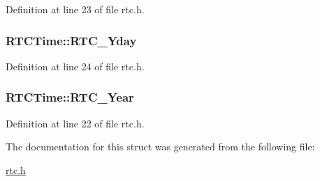 Definition at line 23 of file rtc.h.

\hypertarget{struct_r_t_c_time_aad91737813b216f18c7268b74b33d91a}{
\subsubsection[{RTC\_\-Yday}]{ {\bf RTCTime::RTC\_\-Yday}}}
\label{struct_r_t_c_time_aad91737813b216f18c7268b74b33d91a}


Definition at line 24 of file rtc.h.

\hypertarget{struct_r_t_c_time_aefae78d754a8ef926f4d646e2b7f4bda}{
\subsubsection[{RTC\_\-Year}]{ {\bf RTCTime::RTC\_\-Year}}}
\label{struct_r_t_c_time_aefae78d754a8ef926f4d646e2b7f4bda}


Definition at line 22 of file rtc.h.



The documentation for this struct was generated from the following file:\begin{DoxyCompactItemize}
\item 
\hyperlink{rtc_8h}{rtc.h}\end{DoxyCompactItemize}
